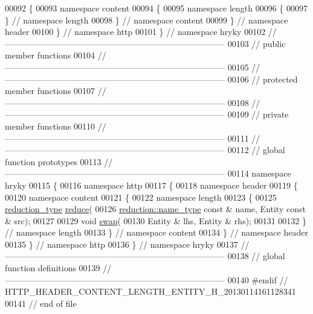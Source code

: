 \begin{DoxyCode}
00092 \{
00093 \textcolor{keyword}{namespace }content
00094 \{
00095 \textcolor{keyword}{namespace }length
00096 \{
00097 \} \textcolor{comment}{// namespace length}
00098 \} \textcolor{comment}{// namespace content}
00099 \} \textcolor{comment}{// namespace header}
00100 \} \textcolor{comment}{// namespace http}
00101 \} \textcolor{comment}{// namespace hryky}
00102 \textcolor{comment}{//
      ------------------------------------------------------------------------------}
00103 \textcolor{comment}{// public member functions}
00104 \textcolor{comment}{//
      ------------------------------------------------------------------------------}
00105 \textcolor{comment}{//
      ------------------------------------------------------------------------------}
00106 \textcolor{comment}{// protected member functions}
00107 \textcolor{comment}{//
      ------------------------------------------------------------------------------}
00108 \textcolor{comment}{//
      ------------------------------------------------------------------------------}
00109 \textcolor{comment}{// private member functions}
00110 \textcolor{comment}{//
      ------------------------------------------------------------------------------}
00111 \textcolor{comment}{//
      ------------------------------------------------------------------------------}
00112 \textcolor{comment}{// global function prototypes}
00113 \textcolor{comment}{//
      ------------------------------------------------------------------------------}
00114 \textcolor{keyword}{namespace }hryky
00115 \{
00116 \textcolor{keyword}{namespace }http
00117 \{
00118 \textcolor{keyword}{namespace }header
00119 \{
00120 \textcolor{keyword}{namespace }content
00121 \{
00122 \textcolor{keyword}{namespace }length
00123 \{
00125     \hyperlink{namespacehryky_a343a9a4c36a586be5c2693156200eadc}{reduction_type} \hyperlink{namespacehryky_1_1http_a08fc36a78a8e2908140fcd102829a566}{reduce}(
00126         \hyperlink{namespacehryky_1_1reduction_ac686c30a4c8d196bbd0f05629a6b921f}{reduction::name_type} \textcolor{keyword}{const} & name, Entity \textcolor{keyword}{const} & src);
00127 
00129     \textcolor{keywordtype}{void} \hyperlink{namespacehryky_1_1http_a38e62595ad532d18fbc65ceb61973aec}{swap}(
00130         Entity & lhs, Entity & rhs);
00131 
00132 \} \textcolor{comment}{// namespace length}
00133 \} \textcolor{comment}{// namespace content}
00134 \} \textcolor{comment}{// namespace header}
00135 \} \textcolor{comment}{// namespace http}
00136 \} \textcolor{comment}{// namespace hryky}
00137 \textcolor{comment}{//
      ------------------------------------------------------------------------------}
00138 \textcolor{comment}{// global function definitions}
00139 \textcolor{comment}{//
      ------------------------------------------------------------------------------}
00140 \textcolor{preprocessor}{#endif // HTTP\_HEADER\_CONTENT\_LENGTH\_ENTITY\_H\_20130114161128341}
00141 \textcolor{preprocessor}{}\textcolor{comment}{// end of file}
\end{DoxyCode}
